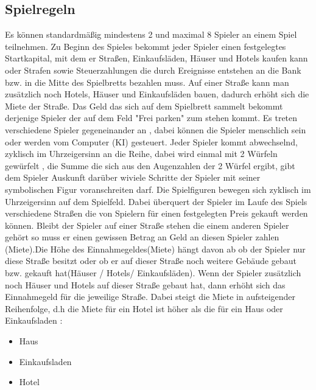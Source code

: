 \documentclass[a4paper,10pt]{article}
\begin{document}
\subsection{Spielregeln}
Es können standardmäßig mindestens 2 und maximal 8 Spieler an einem Spiel teilnehmen. Zu Beginn des Spieles bekommt jeder Spieler einen festgelegtes Startkapital, mit dem er Straßen, Einkaufsläden, Häuser und Hotels kaufen kann oder Strafen sowie Steuerzahlungen die durch Ereignisse entstehen an die Bank bzw. in die Mitte des Spielbretts bezahlen muss. Auf einer Straße kann man zusätzlich noch Hotels, Häuser und Einkaufsläden bauen, dadurch erhöht sich die Miete der Straße. Das Geld das sich auf dem Spielbrett sammelt bekommt derjenige Spieler der auf dem Feld "Frei parken" zum stehen kommt.  Es treten verschiedene Spieler gegeneinander an , dabei können die Spieler menschlich sein oder werden vom Computer (KI) gesteuert. Jeder Spieler kommt abwechselnd, zyklisch im Uhrzeigersinn an die Reihe, dabei wird einmal mit 2 Würfeln gewürfelt , die Summe die sich aus den Augenzahlen der 2 Würfel ergibt, gibt dem Spieler Auskunft darüber wiviele Schritte der Spieler mit seiner symbolischen Figur voranschreiten darf. Die Spielfiguren bewegen sich zyklisch im Uhrzeigersinn auf dem Spielfeld. Dabei überquert der Spieler im Laufe des Spiels verschiedene Straßen die von Spielern für einen festgelegten Preis gekauft werden können. Bleibt der Spieler auf einer Straße stehen die einem anderen Spieler gehört so muss er einen gewissen Betrag an Geld an diesen Spieler zahlen (Miete).Die Höhe des Einnahmegeldes(Miete) hängt davon ab ob der Spieler nur diese Straße besitzt oder ob er auf dieser Straße noch weitere Gebäude gebaut bzw. gekauft hat(Häuser / Hotels/ Einkaufsläden). Wenn der Spieler zusätzlich noch Häuser und Hotels auf dieser Straße gebaut hat, dann erhöht sich das Einnahmegeld für die jeweilige Straße. Dabei steigt die Miete in aufsteigender Reihenfolge, d.h die Miete für ein Hotel ist höher als die für ein Haus oder Einkaufsladen :
\begin {itemize}
\item Haus
\item Einkaufsladen
\item Hotel
\end {itemize}
\end{document}

